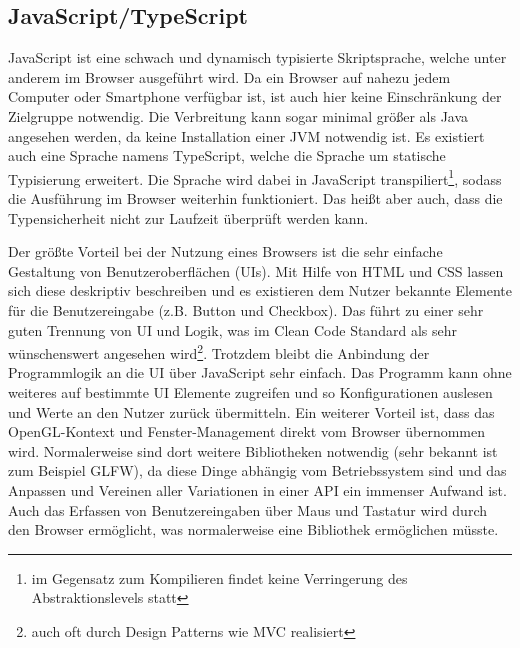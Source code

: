 \subsection{JavaScript/TypeScript}
JavaScript ist eine schwach und dynamisch typisierte Skriptsprache, welche unter anderem im Browser ausgeführt wird. Da ein Browser auf nahezu jedem Computer oder Smartphone verfügbar ist, ist auch hier keine Einschränkung der Zielgruppe notwendig. Die Verbreitung kann sogar minimal größer als Java angesehen werden, da keine Installation einer JVM notwendig ist. Es existiert auch eine Sprache namens TypeScript, welche die Sprache um statische Typisierung erweitert. Die Sprache wird dabei in JavaScript transpiliert\footnote{im Gegensatz zum Kompilieren findet keine Verringerung des Abstraktionslevels statt}, sodass die Ausführung im Browser weiterhin funktioniert. Das heißt aber auch, dass die Typensicherheit nicht zur Laufzeit überprüft werden kann.

Der größte Vorteil bei der Nutzung eines Browsers ist die sehr einfache Gestaltung von Benutzeroberflächen (UIs). Mit Hilfe von HTML und CSS lassen sich diese deskriptiv beschreiben und es existieren dem Nutzer bekannte Elemente für die Benutzereingabe (z.B. Button und Checkbox). Das führt zu einer sehr guten Trennung von UI und Logik, was im Clean Code Standard als sehr wünschenswert angesehen wird\footnote{auch oft durch Design Patterns wie MVC realisiert}. Trotzdem bleibt die Anbindung der Programmlogik an die UI über JavaScript sehr einfach. Das Programm kann ohne weiteres auf bestimmte UI Elemente zugreifen und so Konfigurationen auslesen und Werte an den Nutzer zurück übermitteln. Ein weiterer Vorteil ist, dass das OpenGL-Kontext und Fenster-Management direkt vom Browser übernommen wird. Normalerweise sind dort weitere Bibliotheken notwendig (sehr bekannt ist zum Beispiel GLFW), da diese Dinge abhängig vom Betriebssystem sind und das Anpassen und Vereinen aller Variationen in einer API ein immenser Aufwand ist. Auch das Erfassen von Benutzereingaben über Maus und Tastatur wird durch den Browser ermöglicht, was normalerweise eine Bibliothek ermöglichen müsste.


